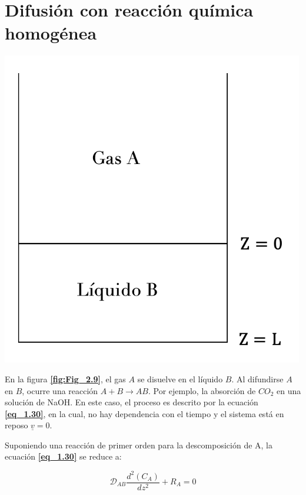 
\section{Difusión con reacción química homogénea}

\begin{minipage}{0.5\textwidth} 
    \centering
    \includegraphics[width=0.8\linewidth]{Capitulo2/Imagenes/Fig_2.9.png} 
    \label{fig:Fig_2.9}
\end{minipage}%
\begin{minipage}{0.4\textwidth} 
    En la figura \textbf{\eqref{fig:Fig_2.9}}, el gas \( A \) se disuelve en el líquido \( B \). Al difundirse \( A \) en \( B \), ocurre una reacción \( A + B \xrightarrow{} AB \). Por ejemplo, la absorción de \( CO_2 \) en una solución de NaOH.
        En este caso, el proceso es descrito por la ecuación \textbf{\eqref{eq_1.30}}, en la cual, no hay dependencia con el tiempo y el sistema está en reposo \( \underline{v} = 0 \).
\end{minipage}
    

\vspace{1 cm}
Suponiendo una reacción de primer orden para la descomposición de A, la ecuación \textbf{\eqref{eq_1.30}} se reduce a:

\begin{equation}   
 \mathscr{D}_{AB}\frac{d^2(C_A)}{dz^2}+R_A=0
 \label{eq_2.55}
\end{equation}


